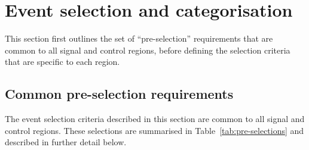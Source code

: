 \section{Event selection and categorisation}
\label{sec:selection}

This section first outlines the set of ``pre-selection'' requirements
that are common to all signal and control regions, before defining the
selection criteria that are specific to each region.

\subsection{Common pre-selection requirements}
\label{sec:preSelection}

The event selection criteria described in this section are common to
all signal and control regions. These selections are summarised in
Table~\ref{tab:pre-selections} and described in further detail below.

